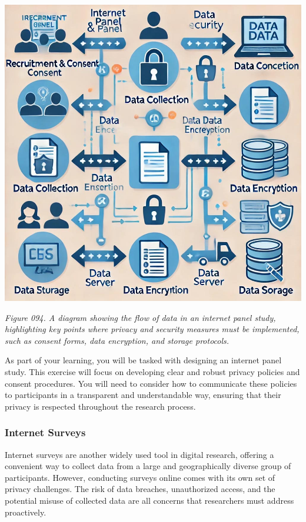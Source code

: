 \documentclass[
]{book}
\begin{document}
\includegraphics[width=1\linewidth,height=\textheight,keepaspectratio]{images/fig094.jpg}

\emph{Figure 094. A diagram showing the flow of data in an internet panel study, highlighting key points where privacy and security measures must be implemented, such as consent forms, data encryption, and storage protocols.}

As part of your learning, you will be tasked with designing an internet panel study. This exercise will focus on developing clear and robust privacy policies and consent procedures. You will need to consider how to communicate these policies to participants in a transparent and understandable way, ensuring that their privacy is respected throughout the research process.

\subsubsection{Internet Surveys}\label{internet-surveys}

Internet surveys are another widely used tool in digital research, offering a convenient way to collect data from a large and geographically diverse group of participants. However, conducting surveys online comes with its own set of privacy challenges. The risk of data breaches, unauthorized access, and the potential misuse of collected data are all concerns that researchers must address proactively.
\end{document}
